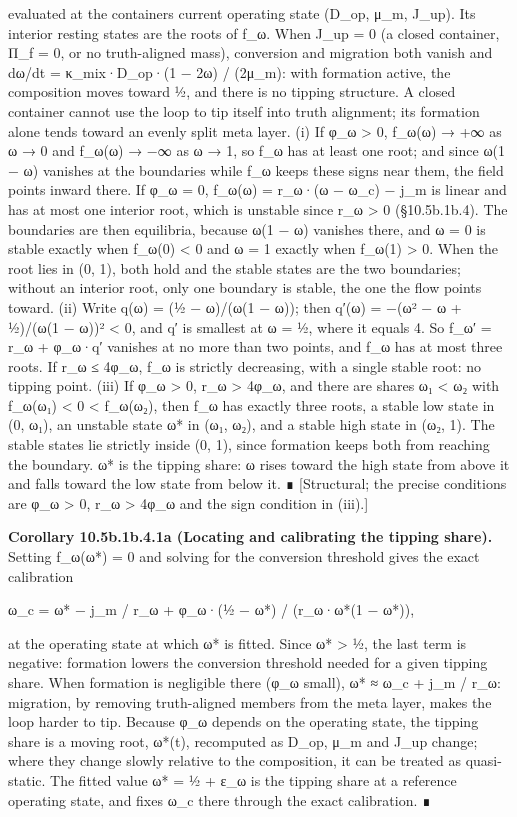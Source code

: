 \documentclass[
]{article}
\begin{document}
evaluated at the container\textquotesingle s current operating state
(D\_op, μ\_m, J\_up). Its interior resting states are the roots of f\_ω.
When J\_up = 0 (a closed container, Π\_f = 0, or no truth-aligned mass),
conversion and migration both vanish and dω/dt = κ\_mix·D\_op·(1 − 2ω) /
(2μ\_m): with formation active, the composition moves toward ½, and
there is no tipping structure. A closed container cannot use the loop to
tip itself into truth alignment; its formation alone tends toward an
evenly split meta layer. (i) If φ\_ω \textgreater{} 0, f\_ω(ω) → +∞ as ω
→ 0 and f\_ω(ω) → −∞ as ω → 1, so f\_ω has at least one root; and since
ω(1 − ω) vanishes at the boundaries while f\_ω keeps these signs near
them, the field points inward there. If φ\_ω = 0, f\_ω(ω) = r\_ω·(ω −
ω\_c) − j\_m is linear and has at most one interior root, which is
unstable since r\_ω \textgreater{} 0 (§10.5b.1b.4). The boundaries are
then equilibria, because ω(1 − ω) vanishes there, and ω = 0 is stable
exactly when f\_ω(0) \textless{} 0 and ω = 1 exactly when f\_ω(1)
\textgreater{} 0. When the root lies in (0, 1), both hold and the stable
states are the two boundaries; without an interior root, only one
boundary is stable, the one the flow points toward. (ii) Write q(ω) = (½
− ω)/(ω(1 − ω)); then q′(ω) = −(ω² − ω + ½)/(ω(1 − ω))² \textless{} 0,
and \textbar q′\textbar{} is smallest at ω = ½, where it equals 4. So
f\_ω′ = r\_ω + φ\_ω·q′ vanishes at no more than two points, and f\_ω has
at most three roots. If r\_ω ≤ 4φ\_ω, f\_ω is strictly decreasing, with
a single stable root: no tipping point. (iii) If φ\_ω \textgreater{} 0,
r\_ω \textgreater{} 4φ\_ω, and there are shares ω₁ \textless{} ω₂ with
f\_ω(ω₁) \textless{} 0 \textless{} f\_ω(ω₂), then f\_ω has exactly three
roots, a stable low state in (0, ω₁), an unstable state ω* in (ω₁, ω₂),
and a stable high state in (ω₂, 1). The stable states lie strictly
inside (0, 1), since formation keeps both from reaching the boundary. ω*
is the tipping share: ω rises toward the high state from above it and
falls toward the low state from below it. ∎ {[}Structural; the precise
conditions are φ\_ω \textgreater{} 0, r\_ω \textgreater{} 4φ\_ω and the
sign condition in (iii).{]}

\textbf{Corollary 10.5b.1b.4.1a (Locating and calibrating the tipping
share).} Setting f\_ω(ω*) = 0 and solving for the conversion threshold
gives the exact calibration

ω\_c = ω* − j\_m / r\_ω + φ\_ω·(½ − ω*) / (r\_ω·ω*(1 − ω*)),

at the operating state at which ω* is fitted. Since ω* \textgreater{} ½,
the last term is negative: formation lowers the conversion threshold
needed for a given tipping share. When formation is negligible there
(φ\_ω small), ω* ≈ ω\_c + j\_m / r\_ω: migration, by removing
truth-aligned members from the meta layer, makes the loop harder to tip.
Because φ\_ω depends on the operating state, the tipping share is a
moving root, ω*(t), recomputed as D\_op, μ\_m and J\_up change; where
they change slowly relative to the composition, it can be treated as
quasi-static. The fitted value ω* = ½ + ε\_ω is the tipping share at a
reference operating state, and fixes ω\_c there through the exact
calibration. ∎
\end{document}
